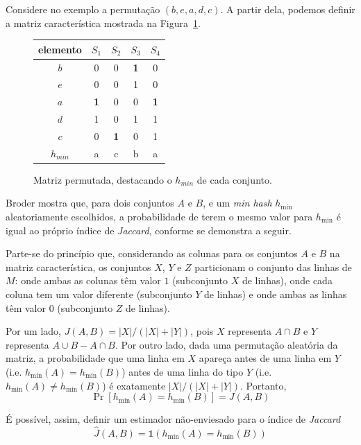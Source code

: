 Considere no exemplo a permutação $(b, e, a, d, c)$. A partir dela, podemos definir a matriz característica mostrada na Figura~\ref{fig:minhash_charmatrix_permutated}.

\begin{figure}[!htbp]
\centering
\begin{tabular}{ c || c | c | c | c }
 elemento & $S_1$ & $S_2$ & $S_3$ & $S_4$ \\
\hline
  $b$ & 0   & 0   & \colorbox{gray!30}{\textbf{1}}   & 0   \\
  $e$ & 0   & 0   & 1   & 0   \\
  $a$ & \colorbox{gray!30}{\textbf{1}}   & 0   & 0   & \colorbox{gray!30}{\textbf{1}}   \\
  $d$ & 1   & 0   & 1   & 1   \\
  $c$ & 0   & \colorbox{gray!30}{\textbf{1}}   & 0   & 1   \\
\hline

  $h_{min}$ & a & c & b & a \\

\end{tabular}
\caption{Matriz permutada, destacando o $h_{min}$ de cada conjunto.}
\label{fig:minhash_charmatrix_permutated}
\end{figure}


Broder \cite{broder1997resemblance} mostra que, para dois conjuntos $A$ e $B$, e um \emph{min hash} $h_{\min}$ aleatoriamente escolhidos, a probabilidade de terem o mesmo valor para $h_{\min}$ é igual ao próprio índice de \emph{Jaccard}, conforme se demonstra a seguir.

Parte-se do princípio que, considerando as colunas para os conjuntos $A$ e $B$ na matriz característica, os conjuntos $X$, $Y$ e $Z$ particionam o conjunto das linhas de $M$: onde ambas as colunas têm valor $1$ (subconjunto $X$ de linhas), onde cada coluna tem um valor diferente (subconjunto $Y$ de linhas) e onde ambas as linhas têm valor $0$ (subconjunto $Z$ de linhas).

Por um lado, $J(A, B) = |X|/(|X|+|Y|)$, pois $X$ representa $A \cap B$ e $Y$ representa $A \cup B - A \cap B$. Por outro lado, dada uma permutação aleatória da matriz, a probabilidade que uma linha em $X$ apareça antes de uma linha em $Y$ (i.e. $h_{\min}(A) = h_{\min}(B)$) antes de uma linha do tipo $Y$ (i.e. $h_{\min}(A) \neq h_{\min}(B)$) é exatamente $|X|/(|X|+|Y|)$. Portanto,
\[
\Pr[h_{\min}(A) = h_{\min}(B)] = J(A, B)
\]

É possível, assim, definir um estimador não-enviesado para o índice de \emph{Jaccard}
\[ 
   \hat{J}(A, B) = \mathds{1}(h_{\min}(A) = h_{\min}(B))
\]

